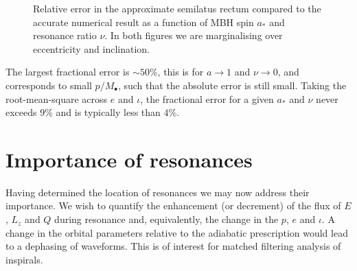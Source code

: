 \begin{figure}%
\centering
  \quad {}
\caption{Relative error in the approximate semilatus rectum compared to the accurate numerical result as a function of MBH spin $a_\ast$ and resonance ratio $\nu$. In both figures we are marginalising over eccentricity and inclination.}\label{fig:p-error}
\end{figure}
The largest fractional error is $\sim50\%$, this is for $a \rightarrow 1$ and $\nu \rightarrow 0$, and corresponds to small $p/M_\bullet$, such that the absolute error is still small. Taking the root-mean-square across $e$ and $\iota$, the fractional error for a given $a_\ast$ and $\nu$ never exceeds $9\%$ and is typically less than $4\%$.

\section{Importance of resonances}\label{sec:importance}

Having determined the location of resonances we may now address their importance. We wish to quantify the enhancement (or decrement) of the flux of $E$, $L_z$ and $Q$ during resonance and, equivalently, the change in the $p$, $e$ and $\iota$. A change in the orbital parameters relative to the adiabatic prescription would lead to a dephasing of waveforms. This is of interest for matched filtering analysis of inspirals.

